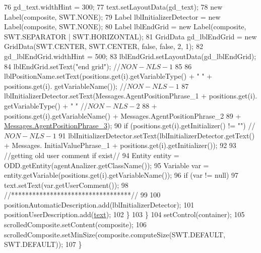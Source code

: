\begin{DoxyCode}
76                 gd\_text.widthHint = 300;
77                 text.setLayoutData(gd\_text);
78                 \textcolor{keyword}{new} Label(composite, SWT.NONE);         
79                 Label lblInitializerDetector = \textcolor{keyword}{new} Label(composite, SWT.NONE);
80                 Label lblEndGrid = \textcolor{keyword}{new} Label(composite, SWT.SEPARATOR | SWT.HORIZONTAL);
81                 GridData gd\_lblEndGrid = \textcolor{keyword}{new} GridData(SWT.CENTER, SWT.CENTER, \textcolor{keyword}{false}, \textcolor{keyword}{false}, 2, 1);
82                 gd\_lblEndGrid.widthHint = 500;
83                 lblEndGrid.setLayoutData(gd\_lblEndGrid);
84                 lblEndGrid.setText(\textcolor{stringliteral}{"end grid"}); \textcolor{comment}{//$NON-NLS-1$}
85                 
86                 lblPositionName.setText(positions.get(i).getVariableType() + \textcolor{stringliteral}{" "} + positions.get(i).
      getVariableName());  \textcolor{comment}{//$NON-NLS-1$}
87                 lblInitializerDetector.setText(Messages.AgentPositionPhrase\_1 + positions.get(i).
      getVariableType() + \textcolor{stringliteral}{" "}  \textcolor{comment}{//$NON-NLS-2$}
88                                         + positions.get(i).getVariableName() +
      Messages.AgentPositionPhrase\_2
89                                         + \hyperlink{classit_1_1isislab_1_1masonassisteddocumentation_1_1mason_1_1wizards_1_1_messages_add8a0a6b873ec534449be8d0582e4ee9}{Messages.AgentPositionPhrase\_3});    
90                 \textcolor{keywordflow}{if} (positions.get(i).getInitializer() != \textcolor{stringliteral}{""})     \textcolor{comment}{//$NON-NLS-1$}
91                     lblInitializerDetector.setText(lblInitializerDetector.getText() + Messages.
      InitialValuePhrase\_1 + positions.get(i).getInitializer());
92                 
93                 \textcolor{comment}{//getting old user comment if exist//}
94                 Entity entity = ODD.getEntity(agentAnalizer.getClassName());
95                 Variable var = entity.getVariable(positions.get(i).getVariableName());
96                 \textcolor{keywordflow}{if} (var != null)
97                     text.setText(var.getUserComment());
98                 \textcolor{comment}{//**********************************//}
99                 
100                 positionAutomaticDescription.add(lblInitializerDetector);
101                 positionUserDescription.add(\hyperlink{classit_1_1isislab_1_1masonassisteddocumentation_1_1mason_1_1wizards_1_1_e___agent_position_page_aa1fe38181afe24af4925ce05d88ae0f6}{text});
102             \}
103         \}
104         setControl(container);
105         scrolledComposite.setContent(composite);
106         scrolledComposite.setMinSize(composite.computeSize(SWT.DEFAULT, SWT.DEFAULT));
107     \}
\end{DoxyCode}
